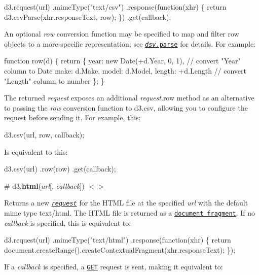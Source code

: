 \begin{DoxyCode}
d3.request(url)
    .mimeType("text/csv")
    .response(function(xhr) \{ return d3.csvParse(xhr.responseText, row); \})
    .get(callback);
\end{DoxyCode}


An optional {\itshape row} conversion function may be specified to map and filter row objects to a more-\/specific representation; see \href{https://github.com/d3/d3-dsv#dsv_parse}{\tt {\itshape dsv}.parse} for details. For example\+:


\begin{DoxyCode}
function row(d) \{
  return \{
    year: new Date(+d.Year, 0, 1), // convert "Year" column to Date
    make: d.Make,
    model: d.Model,
    length: +d.Length // convert "Length" column to number
  \};
\}
\end{DoxyCode}


The returned {\itshape request} exposes an additional {\itshape request}.row method as an alternative to passing the {\itshape row} conversion function to d3.\+csv, allowing you to configure the request before sending it. For example, this\+:


\begin{DoxyCode}
d3.csv(url, row, callback);
\end{DoxyCode}


Is equivalent to this\+:


\begin{DoxyCode}
d3.csv(url)
    .row(row)
    .get(callback);
\end{DoxyCode}


\label{_html}%
\# d3.{\bfseries html}({\itshape url}\mbox{[}, {\itshape callback}\mbox{]}) \href{https://github.com/d3/d3-request/blob/master/src/html.js}{\tt $<$$>$}

Returns a new \href{#request}{\tt {\itshape request}} for the H\+T\+ML file at the specified {\itshape url} with the default mime type {\ttfamily text/html}. The H\+T\+ML file is returned as a \href{https://developer.mozilla.org/en-US/docs/DOM/range.createContextualFragment}{\tt document fragment}. If no {\itshape callback} is specified, this is equivalent to\+:


\begin{DoxyCode}
d3.request(url)
    .mimeType("text/html")
    .response(function(xhr) \{ return document.createRange().createContextualFragment(xhr.responseText); \});
\end{DoxyCode}


If a {\itshape callback} is specified, a \href{#request_get}{\tt G\+ET} request is sent, making it equivalent to\+:


